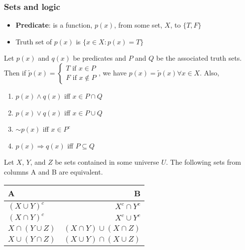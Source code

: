 \documentclass[compress]{beamer}
\begin{document}
\begin{frame}
  \frametitle{Sets and logic}
  \begin{itemize}
  \item \textbf{Predicate}: is a function, $p(x)$, from some set, $X$,
    to $\{T, F \}$
  \item Truth set of $p(x)$ is $\{x \in X: p(x) = T \}$
  \end{itemize}
  \begin{theorem} Let $p(x)$
    and $q(x)$ be predicates and $P$ and $Q$ be
    the associated truth sets. Then if $\tilde{p}(x) = \begin{cases} T
      \text{ if } x \in P \\ 
      F \text{ if } x \not\in P \end{cases}$, we have $p(x) = \tilde{p}(x)
    \forall x \in X$. Also, 
    \begin{enumerate}
    \item\label{i1} $p(x) \wedge q(x)$ iff $x \in P \cap Q$
    \item\label{i2} $p(x) \vee q(x)$ iff $x \in P \cup Q$
    \item\label{i3} $\sim p(x)$ iff $x \in P^c$
    \item\label{i4} $p(x) \Rightarrow q(x)$ iff $P \subseteq Q$
    \end{enumerate}
  \end{theorem}
\end{frame}

\begin{frame}
  \begin{corollary}
    Let $X$, $Y$, and $Z$ be sets contained in some universe $U$. 
    The following sets from columns A and B are equivalent.
    \begin{centering}
      \begin{tabular}{l r}
        A       & B \\ \hline
        $(X \cup Y)^c$ & $X^c \cap Y^c$ \\
        $(X \cap Y)^c$ & $X^c \cup Y^c$ \\
        $X \cap (Y \cup Z)$ & $(X \cap Y) \cup (X \cap Z)$ \\
        $X \cup (Y \cap Z)$ & $(X \cup Y) \cap (X \cup Z)$
      \end{tabular}
    \end{centering}
  \end{corollary}
\end{frame}
\end{document}
